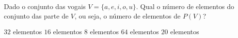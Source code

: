 Dado o conjunto das vogais $V=\{a,e,i,o,u\}$. Qual o número de elementos do conjunto das parte de $V$, ou seja, o número de elementos de $P(V)$?

$32$ elementos
$16$ elementos
$8$ elementos
$64$ elementos
$20$ elementos








